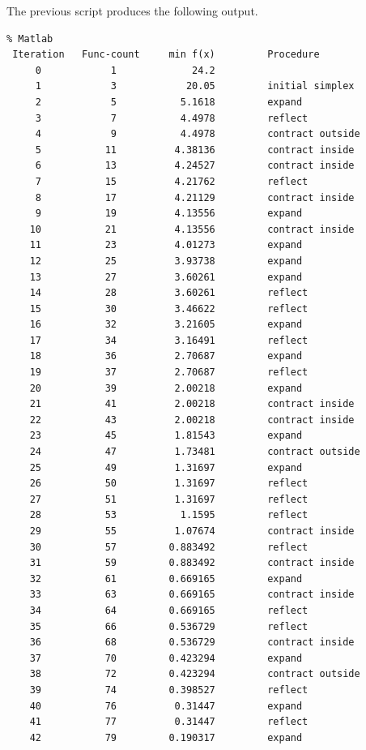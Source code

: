 The previous script produces the following output.

\lstset{language=matlabscript}
\begin{lstlisting}
% Matlab
 Iteration   Func-count     min f(x)         Procedure
     0            1             24.2         
     1            3            20.05         initial simplex
     2            5           5.1618         expand
     3            7           4.4978         reflect
     4            9           4.4978         contract outside
     5           11          4.38136         contract inside
     6           13          4.24527         contract inside
     7           15          4.21762         reflect
     8           17          4.21129         contract inside
     9           19          4.13556         expand
    10           21          4.13556         contract inside
    11           23          4.01273         expand
    12           25          3.93738         expand
    13           27          3.60261         expand
    14           28          3.60261         reflect
    15           30          3.46622         reflect
    16           32          3.21605         expand
    17           34          3.16491         reflect
    18           36          2.70687         expand
    19           37          2.70687         reflect
    20           39          2.00218         expand
    21           41          2.00218         contract inside
    22           43          2.00218         contract inside
    23           45          1.81543         expand
    24           47          1.73481         contract outside
    25           49          1.31697         expand
    26           50          1.31697         reflect
    27           51          1.31697         reflect
    28           53           1.1595         reflect
    29           55          1.07674         contract inside
    30           57         0.883492         reflect
    31           59         0.883492         contract inside
    32           61         0.669165         expand
    33           63         0.669165         contract inside
    34           64         0.669165         reflect
    35           66         0.536729         reflect
    36           68         0.536729         contract inside
    37           70         0.423294         expand
    38           72         0.423294         contract outside
    39           74         0.398527         reflect
    40           76          0.31447         expand
    41           77          0.31447         reflect
    42           79         0.190317         expand

\end{lstlisting}
